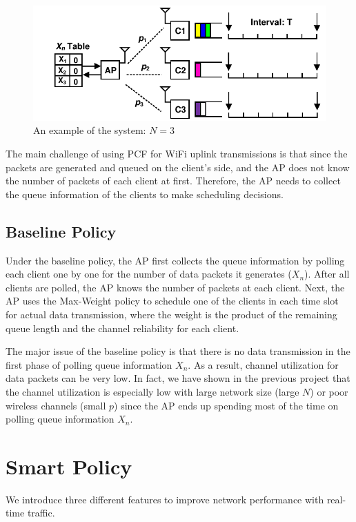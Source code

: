 \documentclass{article}
\begin{document}
\begin{figure}[htbp]
   \centering
   \includegraphics[width=\textwidth]{../presentation/network.pdf}
   \caption{An example of the system: $N=3$}
   \label{fig:network}
\end{figure}

The main challenge of using PCF for WiFi uplink transmissions is that since the packets are generated and queued on the client's side, and the AP does not know the number of packets of each client at first. Therefore, the AP needs to collect the queue information of the clients to make scheduling decisions.

\subsection{Baseline Policy}
Under the baseline policy, the AP first collects the queue information by polling each client one by one for the number of data packets it generates ($X_n$). After all clients are polled, the AP knows the number of packets at each client. Next, the AP uses the Max-Weight policy to schedule one of the clients in each time slot for actual data transmission, where the weight is the product of the remaining queue length and the channel reliability for each client.

The major issue of the baseline policy is that there is no data transmission in the first phase of polling queue information $X_n$. As a result, channel utilization for data packets can be very low. In fact, we have shown in the previous project that the channel utilization is especially low with large network size (large $N$) or poor wireless channels (small $p$) since the AP ends up spending most of the time on polling queue information $X_n$.

\section{Smart Policy}

We introduce three different features to improve network performance with real-time traffic.
\end{document}
